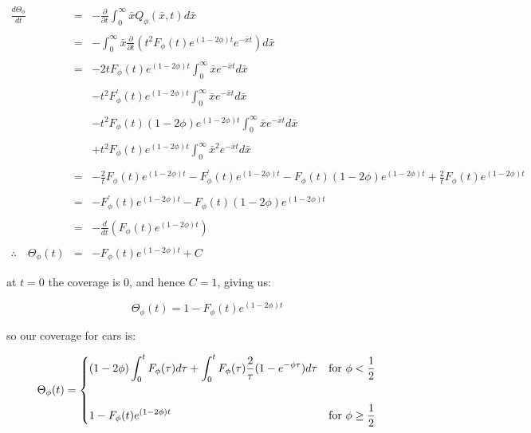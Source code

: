 \begin{eqnarray*}
			\frac{d \Theta_{\phi}}{dt} & = & -\frac{\partial}{\partial t} \int_{0}^{\infty} \bar{x} Q_{\phi}(\bar{x}, t) d\bar{x} \\\\
									   & = & -\int_{0}^{\infty} \bar{x} \frac{\partial}{\partial t} \left( t^2 F_{\phi}(t) e^{(1 - 2 \phi)t} e^{-\bar{x} t} \right) d\bar{x} \\\\
									   & = & -2 t F_{\phi}(t) e^{(1 - 2 \phi)t} \int_{0}^{\infty} \bar{x} e^{-\bar{x} t} d\bar{x} \\\\
									   &   & - t^2 F_{\phi}^{\prime}(t) e^{(1 - 2 \phi)t} \int_{0}^{\infty} \bar{x} e^{-\bar{x} t} d\bar{x} \\\\
									   &   & - t^2 F_{\phi}(t) (1 - 2 \phi) e^{(1 - 2 \phi)t} \int_{0}^{\infty} \bar{x} e^{-\bar{x} t} d\bar{x} \\\\
									   &   & + t^2 F_{\phi}(t) e^{(1 - 2 \phi)t} \int_{0}^{\infty} \bar{x}^2 e^{-\bar{x} t} d\bar{x} \\\\
									   & = & -\frac{2}{t} F_{\phi}(t) e^{(1 - 2 \phi)t} - F_{\phi}^{\prime}(t) e^{(1 - 2 \phi)t} - F_{\phi}(t) (1 - 2 \phi) e^{(1 - 2 \phi)t} + \frac{2}{t} F_{\phi}(t) e^{(1 - 2 \phi)t} \\\\
									   & = & -F_{\phi}^{\prime}(t) e^{(1 - 2 \phi)t} - F_{\phi}(t) (1 - 2 \phi) e^{(1 - 2 \phi)t} \\\\
									   & = & -\frac{d}{dt} \left( F_{\phi}(t) e^{(1 - 2 \phi)t} \right) \\\\
	\therefore \quad \Theta_{\phi} (t) & = & -F_{\phi}(t) e^{(1 - 2 \phi)t} + C
\end{eqnarray*}\medskip

at $t = 0$ the coverage is $0$, and hence $C = 1$, giving us: \bigskip

\[
	\Theta_{\phi} (t) = 1 - F_{\phi}(t) e^{(1 - 2 \phi)t}
\]\medskip

so our coverage for cars is: \bigskip

\begin{eqnarray*}
	\Theta_{\phi}(t) = 
	\begin{dcases}
		(1 - 2 \phi) \int_{0}^{t} F_{\phi}(\tau) d \tau  + \int_{0}^{t} F_{\phi}(\tau) \frac{2}{\tau} (1 - e^{-\phi \tau}) d \tau			& \text{for } \phi < \frac{1}{2} \\\\
		1 - F_{\phi}(t) e^{(1 - 2 \phi)t}																									& \text{for } \phi \geq \frac{1}{2} 
	\end{dcases}
\end{eqnarray*}\medskip

